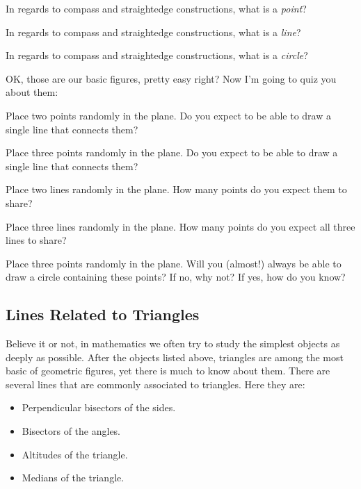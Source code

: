 \begin{question} 
In regards to compass and straightedge constructions, what is a
\textit{point}?
\end{question}
\QM

\begin{question}
In regards to compass and straightedge constructions, what is a
\textit{line}?
\end{question}
\QM


\begin{question}
In regards to compass and straightedge constructions, what is a
\textit{circle}?
\end{question}
\QM


OK, those are our basic figures, pretty easy right? Now I'm going to
quiz you about them:

\begin{question} 
Place two points randomly in the plane. Do you expect to be able to
draw a single line that connects them?
\end{question}
\QM

\begin{question} 
Place three points randomly in the plane. Do you expect to be able to
draw a single line that connects them?
\end{question}
\QM

\begin{question} 
Place two lines randomly in the plane. How many points do you expect
them to share?
\end{question}
\QM


\begin{question} 
Place three lines randomly in the plane. How many points do you expect
all three lines to share?
\end{question}
\QM


\begin{question} 
Place three points randomly in the plane. Will you (almost!) always be
able to draw a circle containing these points? If no, why not? If yes,
how do you know?
\end{question}
\QM




\subsection{Lines Related to Triangles}

Believe it or not, in mathematics we often try to study the simplest
objects as deeply as possible. After the objects listed above,
triangles are among the most basic of geometric figures, yet there is
much to know about them.  There are several lines that are commonly
associated to triangles. Here they are:
\begin{itemize}
\item Perpendicular bisectors of the sides.
\item Bisectors of the angles.
\item Altitudes of the triangle.
\item Medians of the triangle. 
\end{itemize}

